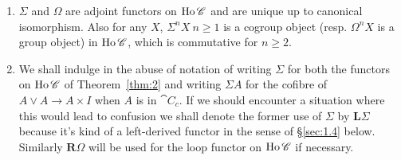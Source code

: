 \documentclass[../main]{subfiles}
\begin{document}
\begin{remark*}
    \begin{enumerate}
        \item $\Sigma$ and $\Omega$ are adjoint functors on $\operatorname{Ho} \mathscr{C}$ and are unique up to canonical isomorphism. Also for any $X$, $\Sigma^n X \ n\geq 1$ is a cogroup object (resp. $\Omega^n X$ is a group object) in $\operatorname{Ho} \mathscr{C}$, which is commutative for $n \geq 2$.
        \item We shall indulge in the abuse of notation of writing $\Sigma$ for both the functors on $\operatorname{Ho} \mathscr{C}$ of Theorem~\ref{thm:2} and writing $\Sigma A$ for the cofibre of $A \vee A \longrightarrow A \times I$ when $A$ is in $\cat{C}_c$. If we should encounter a situation where this would lead to confusion we shall denote the former use of $\Sigma$ by $\mathbf{L}\Sigma$ because it's kind of a left-derived functor in the sense of \S \ref{sec:1.4} below. Similarly $\mathbf{R} \Omega$ will be used for the loop functor on $\operatorname{Ho} \mathscr{C}$ if necessary.
    \end{enumerate}
\end{remark*}
\end{document}
